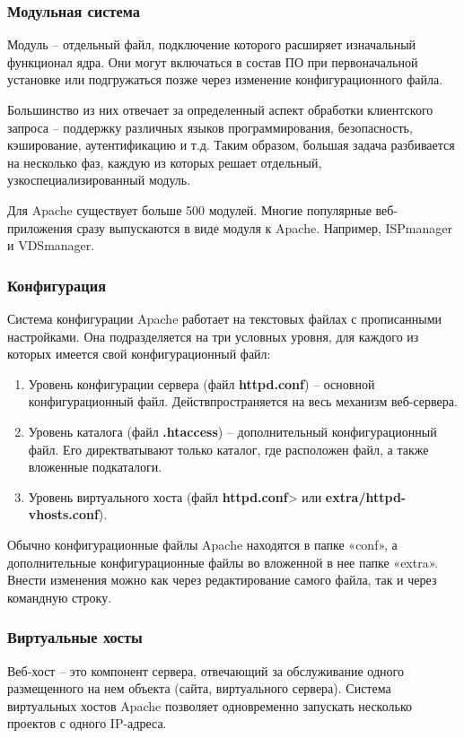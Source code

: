 \documentclass[14pt, a4paper]{article}
\begin{document}
\subsubsection*{Модульная система}
Модуль – отдельный файл, подключение которого расширяет изначальный функционал ядра. Они могут 
включаться в состав ПО при первоначальной установке или подгружаться позже через изменение конфигурационного файла.

Большинство из них отвечает за определенный аспект обработки клиентского запроса – поддержку различных 
языков программирования, безопасность, кэширование, аутентификацию и т.д. Таким образом, большая 
задача разбивается на несколько фаз, каждую из которых решает отдельный, узкоспециализированный модуль.

Для Apache существует больше 500 модулей. Многие популярные веб-приложения сразу выпускаются в виде 
модуля к Apache. Например, \linebreak ISPmanager и VDSmanager.


\subsubsection*{Конфигурация}
Система конфигурации Apache работает на текстовых файлах с прописанными настройками. Она подразделяется на 
три условных уровня, для каждого из которых имеется свой конфигурационный файл:

\begin{enumerate}
    \item Уровень конфигурации сервера (файл \textbf{httpd.conf}) – основной конфигурационный файл. 
    Действпространяется на весь механизм веб-сервера.
    \item Уровень каталога (файл \textbf{.htaccess}) – дополнительный конфигурационный файл. Его 
    директватывают только каталог, где расположен файл, а также вложенные подкаталоги.
    \item Уровень виртуального хоста (файл \textbf{httpd.conf}> или \textbf{extra/httpd-vhosts.conf}).
\end{enumerate}

Обычно конфигурационные файлы Apache находятся в папке «conf», а дополнительные конфигурационные файлы 
во вложенной в нее папке «extra». Внести изменения можно как через редактирование самого файла, так и 
через командную строку.

\subsubsection*{Виртуальные хосты}
Веб-хост – это компонент сервера, отвечающий за обслуживание одного размещенного на нем 
объекта (сайта, виртуального сервера). Система виртуальных хостов Apache позволяет одновременно 
запускать несколько проектов с одного IP-адреса.
\end{document}
